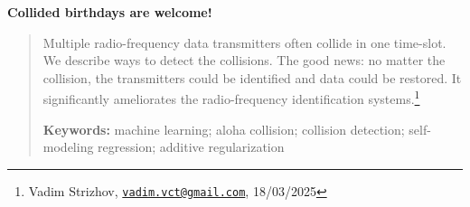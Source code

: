 \documentclass[12pt]{article}
\begin{document}
\begin{center}
{\Huge\bf Collided birthdays are welcome!}  
\end{center}

\begin{quote}
Multiple radio-frequency data transmitters often collide in one time-slot. We describe ways to detect the collisions. The good news: no matter the collision, the transmitters could be identified and data could be restored. It significantly ameliorates the radio-frequency identification systems.\footnote{Vadim Strizhov, \href{mailto:vadim.vct@gmail.com}{\texttt{vadim.vct@gmail.com}}, 18/03/2025}

\bigskip
\noindent \textbf{Keywords:} machine learning; aloha collision; collision detection; self-modeling regression; additive regularization
\bigskip
\end{quote}
\end{document}
